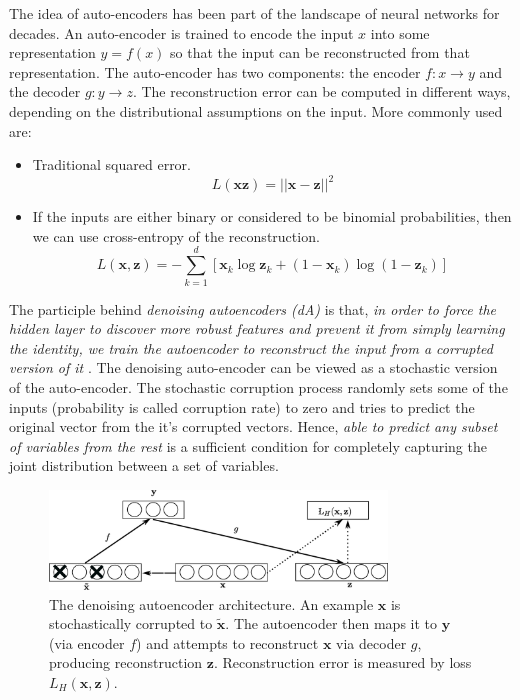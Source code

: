 The idea of auto-encoders has been part of the landscape of neural networks for decades. An auto-encoder is trained to encode the input $x$ into some representation $y = f(x)$ so that the input can be reconstructed from that representation. The auto-encoder has two components: the encoder $f:x \rightarrow y$ and the decoder $g:y\rightarrow z$. The reconstruction error can be computed in different ways, depending on the distributional assumptions on the input. More commonly used are:
\begin{itemize}
\item Traditional squared error.
$$ L(\mathbf{x} \mathbf{z}) = || \mathbf{x} - \mathbf{z} ||^2$$
\item If the inputs are either binary or considered to be binomial probabilities, then we can use cross-entropy of the reconstruction.
$$L(\mathbf{x}, \mathbf{z}) = - \sum^d_{k=1}[\mathbf{x}_k \log \mathbf{z}_k + (1 - \mathbf{x}_k)\log(1 - \mathbf{z}_k)]$$
\end{itemize}

The participle behind \emph{denoising autoencoders (dA)} is that, \textit{in order to force the hidden layer to discover more robust features and prevent it from simply learning the identity, we train the autoencoder to reconstruct the input from a corrupted version of it} \cite{vincent2008extracting}. The denoising auto-encoder can be viewed as a stochastic version of the auto-encoder. The stochastic corruption process randomly sets some of the inputs (probability is called corruption rate) to zero and tries to predict the original vector from the it's corrupted vectors. Hence, \textit{able to predict any subset of variables from the rest} is a sufficient condition for completely capturing the joint distribution between a set of variables.

\begin{figure}[ht]
\centering
\includegraphics[width=0.8\textwidth]{./imgs/sda.eps}
\caption[The denoising autoencoder architecture]{The denoising autoencoder architecture. An example $\mathbf{x}$ is stochastically corrupted to $\mathbf{\tilde{x}}$. The autoencoder then maps it to $\mathbf{y}$ (via encoder $f$) and attempts to reconstruct $\mathbf{x}$ via decoder $g$, producing reconstruction $\mathbf{z}$. Reconstruction error is measured by loss $L_{H}(\mathbf{x},\mathbf{z})$. }
\label{fig:sdaChain}
\end{figure}

